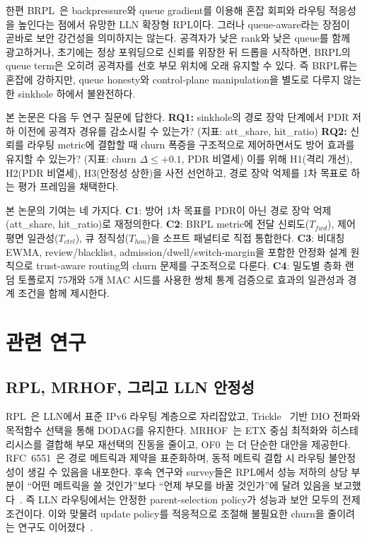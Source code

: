 \documentclass[10pt,a4paper,twocolumn]{article}
\begin{document}
한편 BRPL~\cite{brpl}은 backpressure와 queue gradient를 이용해
혼잡 회피와 라우팅 적응성을 높인다는 점에서 유망한 LLN 확장형 RPL이다.
그러나 queue-aware라는 장점이 곧바로 보안 강건성을 의미하지는 않는다.
공격자가 낮은 rank와 낮은 queue를 함께 광고하거나,
초기에는 정상 포워딩으로 신뢰를 위장한 뒤 드롭을 시작하면,
BRPL의 queue term은 오히려 공격자를 선호 부모 위치에 오래 유지할 수 있다.
즉 BRPL류는 혼잡에 강하지만,
queue honesty와 control-plane manipulation을 별도로 다루지 않는 한
sinkhole 하에서 불완전하다.

본 논문은 다음 두 연구 질문에 답한다.
\textbf{RQ1:} sinkhole의 경로 장악 단계에서 PDR 저하 이전에 공격자 경유를 감소시킬 수 있는가?
(지표: att\_share, hit\_ratio)
\textbf{RQ2:} 신뢰를 라우팅 metric에 결합할 때 churn 폭증을 구조적으로 제어하면서도 방어 효과를 유지할 수 있는가?
(지표: churn $\Delta \leq +0.1$, PDR 비열세)
이를 위해 H1(격리 개선), H2(PDR 비열세), H3(안정성 상한)을 사전 선언하고,
경로 장악 억제를 1차 목표로 하는 평가 프레임을 채택한다.

본 논문의 기여는 네 가지다.
\textbf{C1}: 방어 1차 목표를 PDR이 아닌 경로 장악 억제(att\_share, hit\_ratio)로 재정의한다.
\textbf{C2}: BRPL metric에 전달 신뢰도($T_{fwd}$), 제어 평면 일관성($T_{ctrl}$),
큐 정직성($T_{hon}$)을 소프트 패널티로 직접 통합한다.
\textbf{C3}: 비대칭 EWMA, review/blacklist, admission/dwell/switch-margin을 포함한
안정화 설계 원칙으로 trust-aware routing의 churn 문제를 구조적으로 다룬다.
\textbf{C4}: 밀도별 층화 랜덤 토폴로지 75개와 5개 MAC 시드를 사용한
쌍체 통계 검증으로 효과의 일관성과 경계 조건을 함께 제시한다.


\section{관련 연구}
\label{sec:background}

\subsection{RPL, MRHOF, 그리고 LLN 안정성}

RPL~\cite{rfc6550}은 LLN에서 표준 IPv6 라우팅 계층으로 자리잡았고,
Trickle~\cite{rfc6206} 기반 DIO 전파와 목적함수 선택을 통해
DODAG를 유지한다.
MRHOF~\cite{rfc6719}는 ETX 중심 최적화와 히스테리시스를 결합해
부모 재선택의 진동을 줄이고, OF0~\cite{rfc6552}는 더 단순한 대안을 제공한다.
RFC~6551~\cite{rfc6551}은 경로 메트릭과 제약을 표준화하며,
동적 메트릭 결합 시 라우팅 불안정성이 생길 수 있음을 내포한다.
후속 연구와 survey들은 RPL에서 성능 저하의 상당 부분이
``어떤 메트릭을 쓸 것인가''보다 ``언제 부모를 바꿀 것인가''에 달려 있음을 보고했다~\cite{rpl_stability2015}.
즉 LLN 라우팅에서는 안정한 parent-selection policy가
성능과 보안 모두의 전제 조건이다.
이와 맞물려 update policy를 적응적으로 조절해
불필요한 churn을 줄이려는 연구도 이어졌다~\cite{ghaleb2018}.
\end{document}
